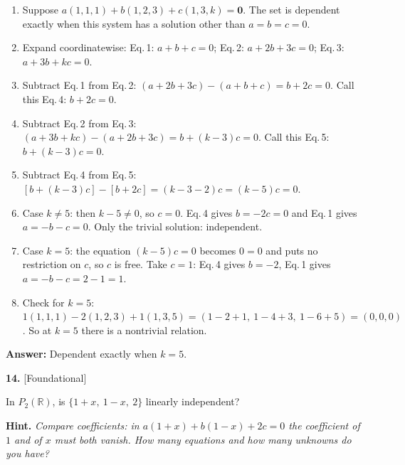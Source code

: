 \documentclass[11pt]{article}
\begin{document}
\begin{tcolorbox}[breakable,colback=ans,colframe=ansb,boxrule=0.5pt,left=4pt,right=4pt,top=2pt,bottom=2pt]\begin{enumerate}[leftmargin=2.2em,itemsep=1pt,topsep=1pt,label=\textbf{Step \arabic*.}]\item Suppose $a(1,1,1)+b(1,2,3)+c(1,3,k)=\mathbf 0$. The set is dependent exactly when this system has a solution other than $a=b=c=0$.
\item Expand coordinatewise: Eq.\,1: $a+b+c=0$; Eq.\,2: $a+2b+3c=0$; Eq.\,3: $a+3b+kc=0$.
\item Subtract Eq.\,1 from Eq.\,2: $(a+2b+3c)-(a+b+c)=b+2c=0$. Call this Eq.\,4: $b+2c=0$.
\item Subtract Eq.\,2 from Eq.\,3: $(a+3b+kc)-(a+2b+3c)=b+(k-3)c=0$. Call this Eq.\,5: $b+(k-3)c=0$.
\item Subtract Eq.\,4 from Eq.\,5: $[b+(k-3)c]-[b+2c]=(k-3-2)c=(k-5)c=0$.
\item Case $k\neq5$: then $k-5\ne0$, so $c=0$. Eq.\,4 gives $b=-2c=0$ and Eq.\,1 gives $a=-b-c=0$. Only the trivial solution: independent.
\item Case $k=5$: the equation $(k-5)c=0$ becomes $0=0$ and puts no restriction on $c$, so $c$ is free. Take $c=1$: Eq.\,4 gives $b=-2$, Eq.\,1 gives $a=-b-c=2-1=1$.
\item Check for $k=5$: $1(1,1,1)-2(1,2,3)+1(1,3,5)=(1-2+1,\ 1-4+3,\ 1-6+5)=(0,0,0)$ \checkmark. So at $k=5$ there is a nontrivial relation.
\end{enumerate}\textbf{Answer:} Dependent exactly when $k=5$.\end{tcolorbox}
\par\vspace{2pt}
\begin{minipage}{\linewidth}\textbf{14.} \hfill{\scriptsize\color{ink}[Foundational]}\par\nopagebreak In $P_{2}(\mathbb{R})$, is $\{1+x,\ 1-x,\ 2\}$ linearly independent?
\par\smallskip\begingroup\small\color{ink}\textbf{Hint.} \textit{Compare coefficients: in $a(1+x)+b(1-x)+2c=0$ the coefficient of $1$ and of $x$ must both vanish. How many equations and how many unknowns do you have?}\endgroup
\end{minipage}\par\nopagebreak
\end{document}
